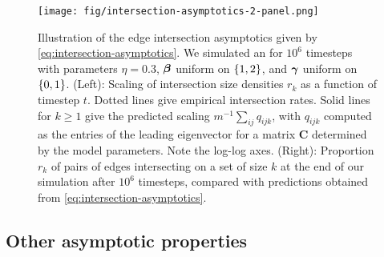 \begin{figure}[!ht]
    \centering \texttt{[image: fig/intersection-asymptotics-2-panel.png]}
    \caption{Illustration of the edge intersection asymptotics given by \cref{eq:intersection-asymptotics}. 
    We simulated an \model for $10^6$ timesteps with parameters $\eta = 0.3$, $\boldsymbol{\beta}$ uniform on $\left\{1,2\right\}$, and $\boldsymbol{\gamma}$ uniform on $\left\{0,1\right\}$.
    (Left): Scaling of intersection size densities $r_k$ as a function of timestep $t$. 
    Dotted lines give empirical intersection rates. 
    Solid lines for $k \geq 1$ give the predicted scaling $m^{-1} \sum_{ij}q_{ijk}$, with $q_{ijk}$ computed as the entries of the leading eigenvector for a matrix $\mathbf{C}$ determined by the model parameters.
    Note the log-log axes. 
    (Right): Proportion $r_k$ of pairs of edges intersecting on a set of size $k$ at the end of our simulation after $10^6$ timesteps, compared with predictions obtained from \cref{eq:intersection-asymptotics}. 
    } 
    \label{fig:intersection-asymptotics}
\end{figure}


\subsection*{Other asymptotic properties}

